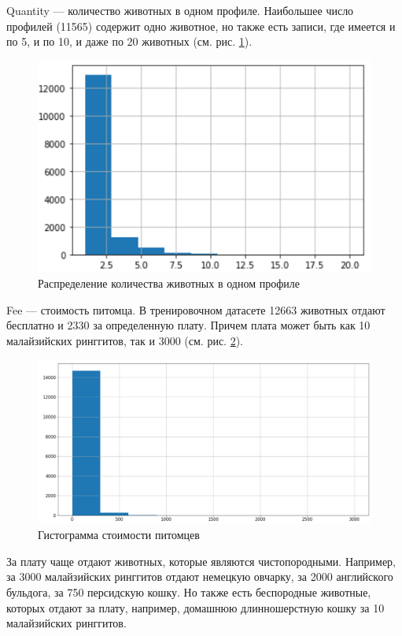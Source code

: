 \documentclass[14pt]{mmcs_article}
\begin{document}
Quantity --- количество животных в одном профиле. Наибольшее число профилей (11565) содержит одно животное, но также есть записи, где имеется и по 5, и по 10, и даже по 20 животных (см. рис. \ref{analyse:count}). 

\begin{figure}[H]
	\centering
	\includegraphics[scale=1]{count.png}
	\caption{Распределение количества животных в одном профиле}\label{analyse:count}
\end{figure}

Fee --- стоимость питомца. В тренировочном датасете 12663 животных отдают бесплатно и 2330 за определенную плату. Причем плата может быть как 10 малайзийских ринггитов, так и 3000 (см. рис. \ref{analyse:fee}). 

\begin{figure}[H]
	\centering
	\includegraphics[scale=0.5]{fee.png}
	\caption{Гистограмма стоимости питомцев}\label{analyse:fee}
\end{figure}

За плату чаще отдают животных, которые являются чистопородными. Например, за 3000 малайзийских ринггитов отдают немецкую овчарку, за 2000 английского бульдога, за 750 персидскую кошку. Но также есть беспородные животные, которых отдают за плату, например, домашнюю длинношерстную кошку за 10 малайзийских ринггитов.
\end{document}
